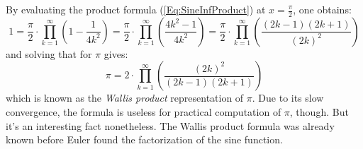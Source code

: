 \medskip
By evaluating the product formula (\ref{Eq:SineInfProduct}) at $x = \frac{\pi}{2}$, one obtains:
\begin{equation}
 1 = \frac{\pi}{2} \cdot \prod_{k=1}^{\infty} \left( 1 - \frac{1}{4 k^2}  \right)
   = \frac{\pi}{2} \cdot \prod_{k=1}^{\infty} \left( \frac{4 k^2 - 1}{4 k^2}  \right)
   = \frac{\pi}{2} \cdot \prod_{k=1}^{\infty} \left( \frac{(2k-1)(2k+1)}{(2k)^2}  \right)   
\end{equation}
and solving that for $\pi$ gives:
\begin{equation}
\pi = 2 \cdot \prod_{k=1}^{\infty} \left( \frac{(2k)^2 }{(2k-1)(2k+1)} \right)   
\end{equation}
which is known as the \emph{Wallis product} representation of $\pi$. Due to its slow convergence, the formula is useless for practical computation of $\pi$, though. But it's an interesting fact nonetheless. The Wallis product formula was already known before Euler found the factorization of the sine function.







